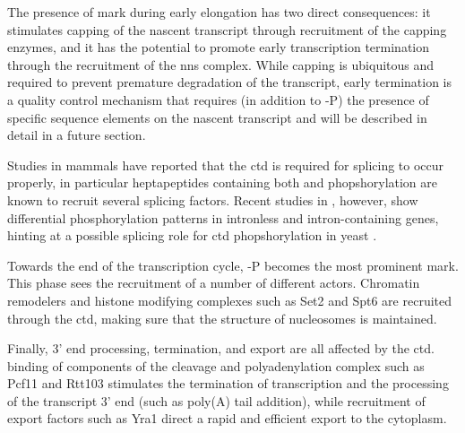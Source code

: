The presence of \serf{} mark during early elongation has two direct consequences: it stimulates capping of the nascent transcript through recruitment of the capping enzymes, and it has the potential to promote early transcription termination through the recruitment of the \gls{nns} complex.
While capping is ubiquitous and required to prevent premature degradation of the transcript, early termination is a quality control mechanism that requires (in addition to \serf{}-P) the presence of specific sequence elements on the nascent transcript and will be described in detail in a future section.

Studies in mammals have reported that the \gls{ctd} is required for splicing to occur properly, in particular heptapeptides containing both \serf{} and \sert{} phopshorylation are known to recruit several splicing factors. Recent studies in \cer{}, however, show differential phosphorylation patterns in intronless and intron-containing genes, hinting at a possible splicing role for \gls{ctd} phopshorylation in yeast \cite{milligan:2016:strandspecific}.

Towards the end of the transcription cycle, \sert{}-P becomes the most prominent mark. 
This phase sees the recruitment of a number of different actors.
Chromatin remodelers and histone modifying complexes such as Set2 and Spt6 are recruited through the \gls{ctd}, making sure that the structure of nucleosomes is maintained.

Finally, 3' end processing, termination, and export are all affected by the \gls{ctd}. binding of components of the cleavage and polyadenylation complex such as Pcf11 and Rtt103 stimulates the termination of transcription and the processing of the transcript 3' end (such as poly(A) tail addition), while recruitment of export factors such as Yra1 direct a rapid and efficient export to the cytoplasm.
 


\clearpage